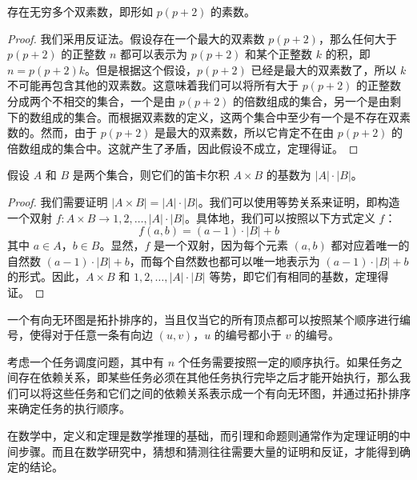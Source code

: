 \begin{conj}
存在无穷多个双素数，即形如 $p(p+2)$ 的素数。
\end{conj}

\begin{proof}
我们采用反证法。假设存在一个最大的双素数 $p(p+2)$，那么任何大于 $p(p+2)$ 的正整数 $n$ 都可以表示为 $p(p+2)$ 和某个正整数 $k$ 的积，即 $n = p(p+2)k$。但是根据这个假设，$p(p+2)$ 已经是最大的双素数了，所以 $k$ 不可能再包含其他的双素数。这意味着我们可以将所有大于 $p(p+2)$ 的正整数分成两个不相交的集合，一个是由 $p(p+2)$ 的倍数组成的集合，另一个是由剩下的数组成的集合。而根据双素数的定义，这两个集合中至少有一个是不存在双素数的。然而，由于 $p(p+2)$ 是最大的双素数，所以它肯定不在由 $p(p+2)$ 的倍数组成的集合中。这就产生了矛盾，因此假设不成立，定理得证。
\end{proof}

\begin{assume}
假设 $A$ 和 $B$ 是两个集合，则它们的笛卡尔积 $A \times B$ 的基数为 $|A| \cdot |B|$。
\end{assume}

\begin{proof}
我们需要证明 $|A \times B| = |A| \cdot |B|$。我们可以使用等势关系来证明，即构造一个双射 $f: A \times B \rightarrow {1,2,\dots,|A| \cdot |B|}$。具体地，我们可以按照以下方式定义 $f$：
\begin{equation}
    f(a,b)=(a-1)\cdot |B|+b
\end{equation}
其中 $a \in A$，$b \in B$。显然，$f$ 是一个双射，因为每个元素 $(a,b)$ 都对应着唯一的自然数 $(a-1) \cdot |B| + b$，而每个自然数也都可以唯一地表示为 $(a-1) \cdot |B| + b$ 的形式。因此，$A \times B$ 和 ${1,2,\dots,|A| \cdot |B|}$ 等势，即它们有相同的基数，定理得证。
\end{proof}

\begin{dfn}
一个有向无环图是拓扑排序的，当且仅当它的所有顶点都可以按照某个顺序进行编号，使得对于任意一条有向边 $(u,v)$，$u$ 的编号都小于 $v$ 的编号。
\end{dfn}

\begin{exmp}
考虑一个任务调度问题，其中有 $n$ 个任务需要按照一定的顺序执行。如果任务之间存在依赖关系，即某些任务必须在其他任务执行完毕之后才能开始执行，那么我们可以将这些任务和它们之间的依赖关系表示成一个有向无环图，并通过拓扑排序来确定任务的执行顺序。
\end{exmp}

\begin{rem}
在数学中，定义和定理是数学推理的基础，而引理和命题则通常作为定理证明的中间步骤。而且在数学研究中，猜想和猜测往往需要大量的证明和反证，才能得到确定的结论。
\end{rem}

